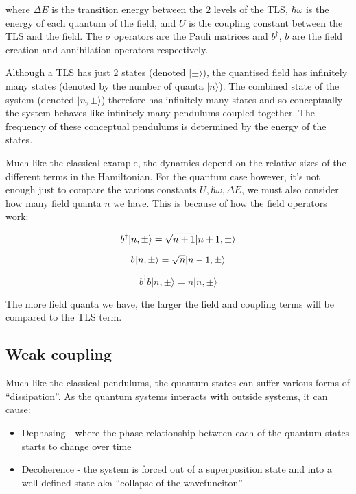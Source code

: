 \documentclass[
]{article}
\renewcommand{\[}{\begin{equation}}
\renewcommand{\]}{\end{equation}}
\providecommand{\tightlist}{%
  \setlength{\itemsep}{0pt}\setlength{\parskip}{0pt}}
\begin{document}
where \(\Delta E\) is the transition energy between the 2 levels of the
TLS, \(\hbar\omega\) is the energy of each quantum of the field, and
\(U\) is the coupling constant between the TLS and the field. The
\(\sigma\) operators are the Pauli matrices and \(b^{\dagger}\), \(b\)
are the field creation and annihilation operators respectively.

Although a TLS has just 2 states (denoted \(|\pm\rangle\)), the
quantised field has infinitely many states (denoted by the number of
quanta \(|n\rangle\)). The combined state of the system (denoted
\(|n, \pm\rangle\)) therefore has infinitely many states and so
conceptually the system behaves like infinitely many pendulums coupled
together. The frequency of these conceptual pendulums is determined by
the energy of the states.

Much like the classical example, the dynamics depend on the relative
sizes of the different terms in the Hamiltonian. For the quantum case
however, it's not enough just to compare the various constants
\(U, \hbar \omega, \Delta E\), we must also consider how many field
quanta \(n\) we have. This is because of how the field operators work:

\[
b^{\dagger} |n,\pm\rangle = \sqrt{n+1}|n+1,\pm\rangle \\
\]

\[
b^{} |n,\pm\rangle = \sqrt{n}|n-1,\pm\rangle \\
\]

\[
b^{\dagger}b |n,\pm\rangle = n|n,\pm\rangle
\]

The more field quanta we have, the larger the field and coupling terms
will be compared to the TLS term.

\subsection{Weak coupling}\label{weak-coupling-1}

Much like the classical pendulums, the quantum states can suffer various
forms of ``dissipation''. As the quantum systems interacts with outside
systems, it can cause:

\begin{itemize}
\tightlist
\item
  Dephasing - where the phase relationship between each of the quantum
  states starts to change over time
\item
  Decoherence - the system is forced out of a superposition state and
  into a well defined state aka ``collapse of the wavefunciton''
\end{itemize}
\end{document}
